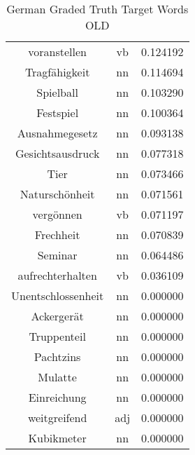 \begin{table}[h]
\begin{tabular}{ccc}
voranstellen       & vb  & 0.124192         \\
Tragfähigkeit      & nn  & 0.114694         \\
Spielball          & nn  & 0.103290         \\
Festspiel          & nn  & 0.100364         \\
Ausnahmegesetz     & nn  & 0.093138         \\
Gesichtsausdruck   & nn  & 0.077318         \\
Tier               & nn  & 0.073466         \\
Naturschönheit     & nn  & 0.071561         \\
vergönnen          & vb  & 0.071197         \\
Frechheit          & nn  & 0.070839         \\
Seminar            & nn  & 0.064486         \\
aufrechterhalten   & vb  & 0.036109         \\
Unentschlossenheit & nn  & 0.000000         \\
Ackergerät         & nn  & 0.000000         \\
Truppenteil        & nn  & 0.000000         \\
Pachtzins          & nn  & 0.000000         \\
Mulatte            & nn  & 0.000000         \\
Einreichung        & nn  & 0.000000         \\
weitgreifend       & adj & 0.000000         \\
Kubikmeter         & nn  & 0.000000         \\
\bottomrule
\end{tabular}
\caption{German Graded Truth Target Words OLD}
\label{tab:deu-truthtargetsOLD}
\end{table}



